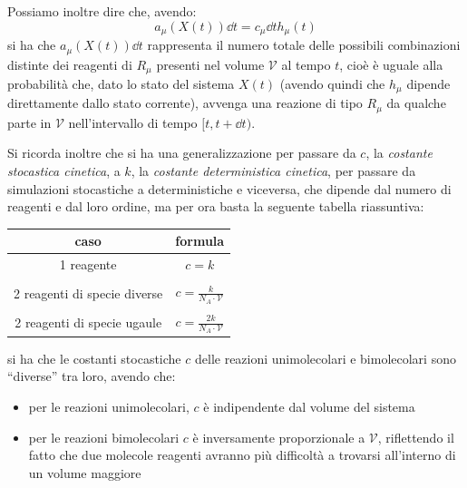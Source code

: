 \documentclass[a4paper,12pt, oneside]{book}
\begin{document}
Possiamo inoltre dire che, avendo:
\[a_\mu(X(t))\dd{t}=c_\mu\dd{t} h_\mu(t)\]
si ha che $a_\mu(X(t))\dd{t}$ rappresenta il numero totale delle possibili
combinazioni distinte dei reagenti di $R_\mu$ presenti nel volume $\mathcal{V}$
al tempo $t$, cioè 
è uguale alla probabilità che, dato lo stato del sistema $X(t)$ (avendo quindi
che $h_\mu$ dipende direttamente dallo stato corrente), avvenga una
reazione di tipo $R_\mu$ da qualche parte in $\mathcal{V}$ nell'intervallo di
tempo $[t, t+\dd{t})$. 
\begin{shaded}
  Si ricorda inoltre che si ha una generalizzazione per passare da $c$, la
  \textit{costante stocastica cinetica}, a $k$, la \textit{costante
  deterministica 
  cinetica}, per passare da simulazioni stocastiche a deterministiche e
  viceversa, che dipende dal numero di 
  reagenti e dal loro ordine, ma per ora basta la seguente
  tabella riassuntiva:
  \begin{table}[H]
    \centering
    \begin{tabular}{c|c}
      caso&formula\\
      \hline
      1 reagente & $c=k$\\
          &\\
      2 reagenti di specie diverse & $c=\frac{k}{N_A\cdot \mathcal{V}}$\\
          &\\
      2 reagenti di specie ugaule & $c=\frac{2k}{N_A\cdot \mathcal{V}}$
    \end{tabular}
  \end{table}
  si ha che le costanti stocastiche $c$ delle reazioni unimolecolari e
  bimolecolari sono ``diverse'' tra loro, avendo che:
  \begin{itemize}
    \item per le reazioni unimolecolari, $c$ è indipendente dal volume del
    sistema 
    \item per le reazioni bimolecolari $c$ è inversamente proporzionale a
    $\mathcal{V}$, 
    riflettendo il fatto che due molecole reagenti avranno più difficoltà a
    trovarsi all'interno di un volume maggiore 
  \end{itemize}
\end{shaded}
\end{document}
